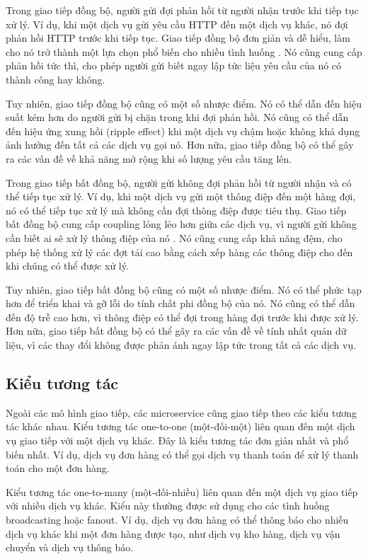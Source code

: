 Trong giao tiếp đồng bộ, người gửi đợi phản hồi từ người nhận trước khi tiếp
tục xử lý. Ví dụ, khi một dịch vụ gửi yêu cầu HTTP đến một dịch vụ khác, nó đợi
phản hồi HTTP trước khi tiếp tục. Giao tiếp đồng bộ đơn giản và dễ hiểu, làm
cho nó trở thành một lựa chọn phổ biến cho nhiều tình huống \cite{newman2015}. Nó cũng cung cấp
phản hồi tức thì, cho phép người gửi biết ngay lập tức liệu yêu cầu của nó có
thành công hay không.

Tuy nhiên, giao tiếp đồng bộ cũng có một số nhược điểm. Nó có thể dẫn đến hiệu
suất kém hơn do người gửi bị chặn trong khi đợi phản hồi. Nó cũng có thể dẫn
đến hiệu ứng xung hồi (ripple effect) khi một dịch vụ chậm hoặc không khả dụng
ảnh hưởng đến tất cả các dịch vụ gọi nó. Hơn nữa, giao tiếp đồng bộ có thể gây
ra các vấn đề về khả năng mở rộng khi số lượng yêu cầu tăng lên.

Trong giao tiếp bất đồng bộ, người gửi không đợi phản hồi từ người nhận và có
thể tiếp tục xử lý. Ví dụ, khi một dịch vụ gửi một thông điệp đến một hàng đợi,
nó có thể tiếp tục xử lý mà không cần đợi thông điệp được tiêu thụ. Giao tiếp
bất đồng bộ cung cấp coupling lỏng lẻo hơn giữa các dịch vụ, vì người gửi không
cần biết ai sẽ xử lý thông điệp của nó \cite{hohpe2004}. Nó cũng cung cấp khả năng đệm, cho phép
hệ thống xử lý các đợt tải cao bằng cách xếp hàng các thông điệp cho đến khi
chúng có thể được xử lý.

Tuy nhiên, giao tiếp bất đồng bộ cũng có một số nhược điểm. Nó có thể phức tạp
hơn để triển khai và gỡ lỗi do tính chất phi đồng bộ của nó. Nó cũng có thể dẫn
đến độ trễ cao hơn, vì thông điệp có thể đợi trong hàng đợi trước khi được xử
lý. Hơn nữa, giao tiếp bất đồng bộ có thể gây ra các vấn đề về tính nhất quán
dữ liệu, vì các thay đổi không được phản ánh ngay lập tức trong tất cả các dịch
vụ.

\subsection{Kiểu tương tác}
Ngoài các mô hình giao tiếp, các microservice cũng giao tiếp theo các kiểu
tương tác khác nhau. Kiểu tương tác one-to-one (một-đối-một) liên quan đến một
dịch vụ giao tiếp với một dịch vụ khác. Đây là kiểu tương tác đơn giản nhất và
phổ biến nhất. Ví dụ, dịch vụ đơn hàng có thể gọi dịch vụ thanh toán để xử lý
thanh toán cho một đơn hàng.

Kiểu tương tác one-to-many (một-đối-nhiều) liên quan đến một dịch vụ giao tiếp
với nhiều dịch vụ khác. Kiểu này thường được sử dụng cho các tình huống
broadcasting hoặc fanout. Ví dụ, dịch vụ đơn hàng có thể thông báo cho nhiều
dịch vụ khác khi một đơn hàng được tạo, như dịch vụ kho hàng, dịch vụ vận
chuyển và dịch vụ thông báo.

